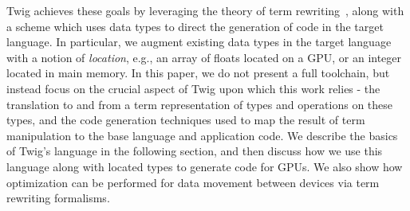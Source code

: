 Twig achieves these goals by leveraging the theory of term
rewriting~\cite{baader98rewriting}, along with a scheme which uses
data types to direct the generation of code in the target language. In
particular, we augment existing data types in the target language with
a notion of \emph{location}, e.g., an array of floats located on a
GPU, or an integer located in main memory.  In this paper, we do not
present a full toolchain, but instead focus on the crucial aspect of
Twig upon which this work relies - the translation to and from a term
representation of types and operations on these types, and the code
generation techniques used to map the result of term manipulation to
the base language and application code.  We describe the basics of
Twig's language in the following section, and then discuss how we use
this language along with located types to generate code for GPUs.  We
also show how optimization can be performed for data movement between 
devices via term rewriting formalisms.



